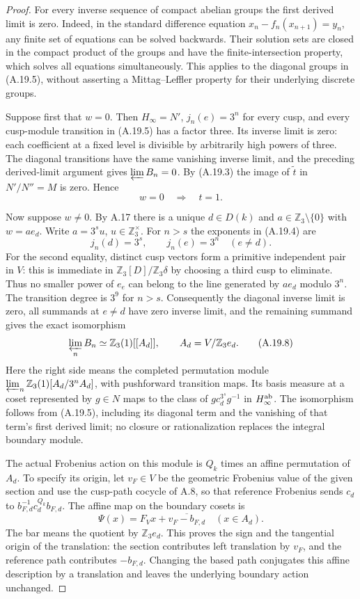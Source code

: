 \begin{proof}
For every inverse sequence of compact abelian groups the
first derived limit is zero. Indeed, in the standard
difference equation $x_n-f_n(x_{n+1})=y_n$, any finite
set of equations can be solved backwards. Their solution
sets are closed in the compact product of the groups and
have the finite-intersection property, which solves all
equations simultaneously. This applies to the diagonal
groups in (A.19.5), without asserting a Mittag--Leffler
property for their underlying discrete groups.

Suppose first that $w=0$. Then $H_\infty=N'$,
$j_n(e)=3^n$ for every cusp, and every cusp-module
transition in (A.19.5) has a factor three. Its inverse
limit is zero: each coefficient at a fixed level is
divisible by arbitrarily high powers of three. The
diagonal transitions have the same vanishing inverse
limit, and the preceding derived-limit argument gives
$\varprojlim B_n=0$. By (A.19.3) the image of
$\widetilde t$ in $N'/N''=M$ is zero. Hence
\[
                       w=0\quad\Longrightarrow\quad t=1.
 \tag{A.19.6}
\]

Now suppose $w\ne0$. By A.17 there is a unique
$d\in D(k)$ and $a\in\mathbb Z_3\setminus\{0\}$ with
$w=a e_d$. Write $a=3^s u$, $u\in\mathbb Z_3^\times$.
For $n>s$ the exponents in (A.19.4) are
\[
 j_n(d)=3^s,\qquad j_n(e)=3^n\quad(e\ne d).
 \tag{A.19.7}
\]
For the second equality, distinct cusp vectors form a
primitive independent pair in $V$: this is immediate in
$\mathbb Z_3[D]/\mathbb Z_3\delta$ by choosing a third
cusp to eliminate. Thus no smaller power of $e_e$ can
belong to the line generated by $a e_d$ modulo $3^n$.
The transition degree is $3^9$ for $n>s$. Consequently
the diagonal inverse limit is zero, all summands at
$e\ne d$ have zero inverse limit, and the remaining
summand gives the exact isomorphism
\[
 \varprojlim_n B_n\simeq
 \mathbb Z_3(1)[[A_d]],\qquad A_d=V/\mathbb Z_3e_d.
 \tag{A.19.8}
\]
Here the right side means the completed permutation module
$\varprojlim_n\mathbb Z_3(1)[A_d/3^nA_d]$, with
pushforward transition maps. Its basis measure at a coset
represented by $g\in N$ maps to the class of
$g c_d^{3^s}g^{-1}$ in $H_\infty^{\rm ab}$.
The isomorphism follows from (A.19.5), including its
diagonal term and the vanishing of that term's first
derived limit; no closure or rationalization replaces
the integral boundary module.

The actual Frobenius action on this module is $Q_k$
times an affine permutation of $A_d$. To specify its
origin, let $v_F\in V$ be the geometric Frobenius value
of the given section and use the cusp-path cocycle of
A.8, so that reference Frobenius sends
$c_d$ to $b_{F,d}^{-1}c_d^{Q_k}b_{F,d}$.
The affine map on the boundary cosets is
\[
 \Psi(x)=F_Vx+\overline{v_F-b_{F,d}}\quad(x\in A_d).
 \tag{A.19.9}
\]
The bar means the quotient by $\mathbb Z_3e_d$.
This proves the sign and the tangential origin of the
translation: the section contributes left translation
by $v_F$, and the reference path contributes
$-b_{F,d}$. Changing the based path conjugates this
affine description by a translation and leaves the
underlying boundary action unchanged.


\end{proof}
